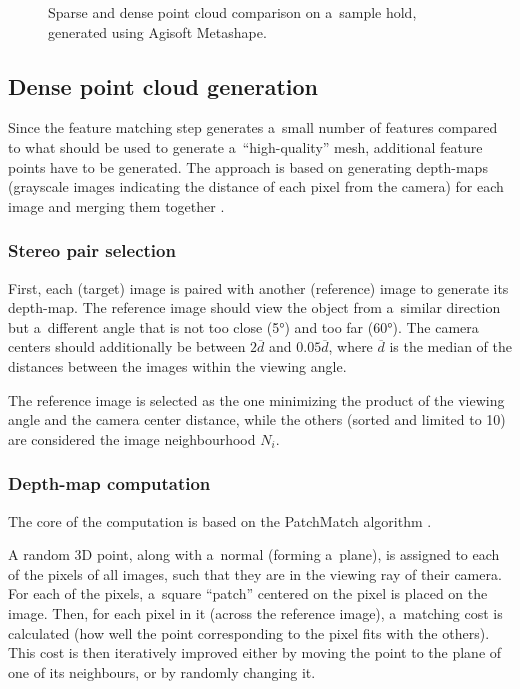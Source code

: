 \begin{figure}[h]
	\centering
	\hfill
	\caption{Sparse and dense point cloud comparison on a~sample hold, generated using Agisoft Metashape.}%
\end{figure}

\subsection{Dense point cloud generation}
Since the feature matching step generates a~small number of features compared to what should be used to generate a~``high-quality'' mesh, additional feature points have to be generated.
The approach is based on generating depth-maps (grayscale images indicating the distance of each pixel from the camera) for each image and merging them together \cite{shen2013accurate}.

\subsubsection{Stereo pair selection}
First, each (target) image is paired with another (reference) image to generate its depth-map.
The reference image should view the object from a~similar direction but a~different angle that is not too close (\ang{5}) and too far (\ang{60}).
The camera centers should additionally be between $2 \overline{d}$ and $0.05 \overline{d}$, where $\overline{d}$ is the median of the distances between the images within the viewing angle.

The reference image is selected as the one minimizing the product of the viewing angle and the camera center distance, while the others (sorted and limited to 10) are considered the image neighbourhood $N_i$.

\subsubsection{Depth-map computation}
The core of the computation is based on the PatchMatch algorithm \cite{barnes2009PAR}.

A random 3D point, along with a~normal (forming a~plane), is assigned to each of the pixels of all images, such that they are in the viewing ray of their camera.
For each of the pixels, a~square ``patch'' centered on the pixel is placed on the image.
Then, for each pixel in it (across the reference image), a~matching cost is calculated (how well the point corresponding to the pixel fits with the others).
This cost is then iteratively improved either by moving the point to the plane of one of its neighbours, or by randomly changing it.

